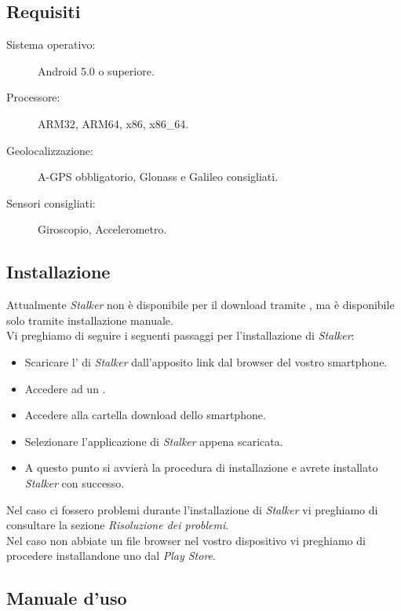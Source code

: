 \documentclass[../manuale-utente.tex]{subfiles}
\begin{document}
\subsection{Requisiti}%
\label{sub:requisiti}

\begin{description}
    \item[Sistema operativo:] Android 5.0 o superiore.
    \item[Processore:] ARM32, ARM64, x86, x86\_64.
    \item[Geolocalizzazione:] A-GPS obbligatorio, Glonass e Galileo consigliati.
    \item[Sensori consigliati:] Giroscopio, Accelerometro.
\end{description}

\subsection{Installazione}

Attualmente \emph{Stalker} non è disponibile per il download tramite , ma è disponibile solo tramite installazione manuale.\\
Vi preghiamo di seguire i seguenti passaggi per l'installazione di \emph{Stalker}:
\begin{itemize}
\item Scaricare l' di \emph{Stalker} dall'apposito link dal browser del vostro smartphone.
\item Accedere ad un .
\item Accedere alla cartella download dello smartphone.
\item Selezionare l'applicazione di \emph{Stalker} appena scaricata.
\item A questo punto si avvierà la procedura di installazione e avrete installato \emph{Stalker} con successo.
\end{itemize}
Nel caso ci fossero problemi durante l'installazione di \emph{Stalker} vi preghiamo di consultare la sezione \emph{Risoluzione dei problemi}.\\
Nel caso non abbiate un file browser nel vostro dispositivo vi preghiamo di procedere installandone uno dal \emph{Play Store}.
\newpage

\subsection{Manuale d'uso}%
\label{sub:manuale_uso_mobile}
\end{document}
